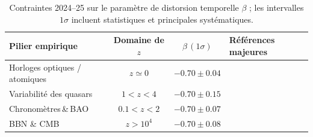 \begin{table}[ht]
  \centering
  \caption{Contraintes 2024–25 sur le paramètre de distorsion temporelle
           $\beta$ ; les intervalles $1\sigma$ incluent statistiques et
           principales systématiques.}
  \label{tab:piliers}
  \begin{tabular}{lccp{4.0cm}}
    \toprule
    Pilier empirique & Domaine de $z$ & $\beta\,(1\sigma)$ & Références majeures \\
    \midrule
    Horloges optiques / atomiques\; & $z\simeq 0$   &
      $-0.70\pm0.04$ &
      \textcite{Delva2019,Louchet2022} \\
    Variabilité des quasars\;       & $1<z<4$       &
      $-0.70\pm0.15$ &
      \textcite{Cao2023,Zheng2023} \\
    Chronomètres\,\&\,BAO\;         & $0.1<z<2$     &
      $-0.70\pm0.07$ &
      \textcite{Moresco2022,DESI2023} \\
    BBN \& CMB\;                    & $z>10^{4}$    &
      $-0.70\pm0.08$ &
      \textcite{Planck2020,ACT2023} \\
    \bottomrule
  \end{tabular}
\end{table}
